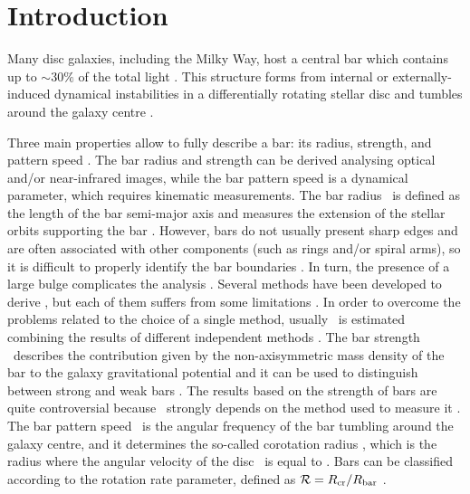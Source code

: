 \documentclass{aa}
\begin{document}
\section{Introduction}

Many disc galaxies, including the Milky Way, host a central bar which contains up to $\sim 30\%$ of the total light \citep{Marinova2007,barazza2008,Aguerri2009,BlandHawthorn2016}. This structure forms from internal or externally-induced dynamical instabilities in a differentially rotating stellar disc and tumbles around the galaxy centre \citep{Sellwood1981,Noguchi1988,Friedli1999,MartinezValpuesta2017}.

Three main properties allow to fully describe a bar: its radius, strength, and pattern speed \citep[e.g.,][]{Aguerri2015}. The bar radius and strength can be derived analysing optical and/or near-infrared images, while the bar pattern speed is a dynamical parameter, which requires kinematic measurements. The bar radius \rbar\ is defined as the length of the bar semi-major axis and measures the extension of the stellar orbits supporting the bar \citep{contopoulos1980,Contopoulos1981}. However, bars do not usually present sharp edges and are often associated with other components (such as rings and/or spiral arms), so it is difficult to properly identify the bar boundaries \citep{Aguerri2009}. In turn, the presence of a large bulge complicates the analysis \citep{aguerri2005}. Several methods have been developed to derive \rbar, but each of them suffers from some limitations \citep[see e.g.,][for a discussion]{Corsini2011}. In order to overcome the problems related to the choice of a single method, usually \rbar\ is estimated combining the results of different independent methods \citep{Corsini2003,Guo2019,Cuomo2020}. The bar strength \sbar\ describes the contribution given by the non-axisymmetric mass density of the bar to the galaxy gravitational potential \citep{buta01} and it can be used to distinguish between strong and weak bars \citep{Cuomo2019b}. The results based on the strength of bars are quite controversial because \sbar\ strongly depends on the method used to measure it \citep{Lee2020}. The bar pattern speed \omegabar\ is the angular frequency of the bar tumbling around the galaxy centre, and it determines the so-called corotation radius \rcor, which is the radius where the angular velocity of the disc \vcirc\ is equal to \omegabar. Bars can be classified according to the rotation rate parameter, defined as ${\cal R}=R_{\rm cr}/R_{\rm bar}$ \citep{Elmegreen1996bis}. 
\end{document}
